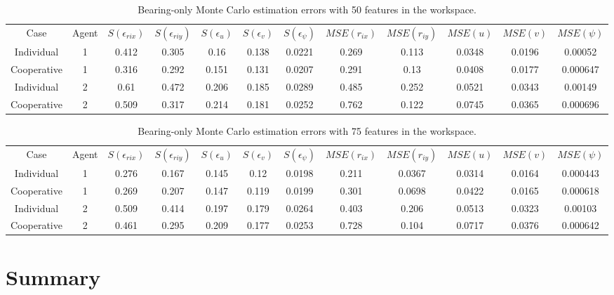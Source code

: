 \documentclass{aiaa-tc}
\begin{document}
\begin{table}[t!]
\scriptsize
\centering
\begin{tabular}{c|c|c|c|c|c|c|c|c|c|c|c|}
Case & Agent & $S(\epsilon_{rix})$ & $S(\epsilon_{riy})$ & $S(\epsilon_{u})$ & $S(\epsilon_{v})$ & $S(\epsilon_{\psi})$ & $MSE(r_{ix})$ & $MSE(r_{iy})$ & $MSE(u)$ & $MSE(v)$ & $MSE(\psi)$ \\
Individual & 1& 0.412& 0.305& 0.16& 0.138& 0.0221& 0.269& 0.113& 0.0348& 0.0196& 0.00052 \\
Cooperative & 1& 0.316& 0.292& 0.151& 0.131& 0.0207& 0.291& 0.13& 0.0408& 0.0177& 0.000647 \\
Individual & 2& 0.61& 0.472& 0.206& 0.185& 0.0289& 0.485& 0.252& 0.0521& 0.0343& 0.00149 \\
Cooperative & 2& 0.509& 0.317& 0.214& 0.181& 0.0252& 0.762& 0.122& 0.0745& 0.0365& 0.000696
\end{tabular}
\caption{Bearing-only Monte Carlo estimation errors with 50 features in the workspace.}
\label{tab:M_50_features}
\end{table}

\begin{table}[t!]
\scriptsize
\centering
\begin{tabular}{c|c|c|c|c|c|c|c|c|c|c|c|}
Case & Agent & $S(\epsilon_{rix})$ & $S(\epsilon_{riy})$ & $S(\epsilon_{u})$ & $S(\epsilon_{v})$ & $S(\epsilon_{\psi})$ & $MSE(r_{ix})$ & $MSE(r_{iy})$ & $MSE(u)$ & $MSE(v)$ & $MSE(\psi)$ \\
Individual & 1& 0.276& 0.167& 0.145& 0.12& 0.0198& 0.211& 0.0367& 0.0314& 0.0164& 0.000443 \\
Cooperative & 1& 0.269& 0.207& 0.147& 0.119& 0.0199& 0.301& 0.0698& 0.0422& 0.0165& 0.000618 \\
Individual & 2& 0.509& 0.414& 0.197& 0.179& 0.0264& 0.403& 0.206& 0.0513& 0.0323& 0.00103 \\
Cooperative & 2& 0.461& 0.295& 0.209& 0.177& 0.0253& 0.728& 0.104& 0.0717& 0.0376& 0.000642
\end{tabular}
\caption{Bearing-only Monte Carlo estimation errors with 75 features in the workspace.}
\label{tab:M_75_features}
\end{table}

\pagebreak
\section{Summary}
\end{document}
